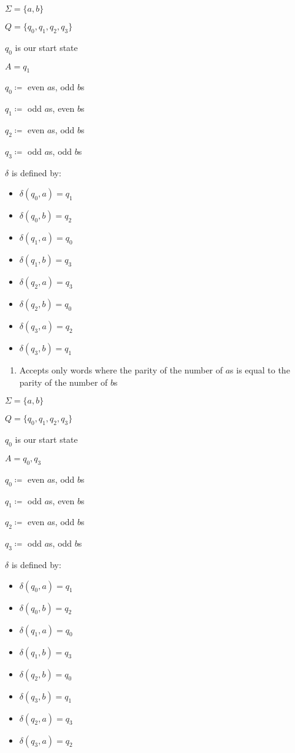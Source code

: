 \documentclass{article}
\begin{document}
\(\Sigma = \{a,b\}\)

\(Q = \{q_0, q_1, q_2, q_3\}\)

\(q_0\) is our start state

\(A = q_1\)

\(q_0 \coloneqq\) even \(a\)s, odd \(b\)s

\(q_1 \coloneqq\) odd \(a\)s, even \(b\)s

\(q_2 \coloneqq\) even \(a\)s, odd \(b\)s

\(q_3 \coloneqq\) odd \(a\)s, odd \(b\)s

\(\delta\) is defined by:
\begin{itemize}
    \item \(\delta(q_0, a) = q_1\)
    \item \(\delta(q_0, b) = q_2\)
    \item \(\delta(q_1, a) = q_0\)
    \item \(\delta(q_1, b) = q_3\)
    \item \(\delta(q_2, a) = q_3\)
    \item \(\delta(q_2, b) = q_0\)
    \item \(\delta(q_3, a) = q_2\)
    \item \(\delta(q_3, b) = q_1\)
\end{itemize}


\begin{enumerate}
\def\labelenumi{\arabic{enumi}.}
\setcounter{enumi}{2}
\item
  Accepts only words where the parity of the number of \(a\)s is equal
  to the parity of the number of \(b\)s
\end{enumerate}

\(\Sigma = \{a,b\}\)

\(Q = \{q_0, q_1, q_2, q_3\}\)

\(q_0\) is our start state

\(A = q_0, q_3\)

\(q_0 \coloneqq\) even \(a\)s, odd \(b\)s

\(q_1 \coloneqq\) odd \(a\)s, even \(b\)s

\(q_2 \coloneqq\) even \(a\)s, odd \(b\)s

\(q_3 \coloneqq\) odd \(a\)s, odd \(b\)s

\(\delta\) is defined by:
\begin{itemize}
    \item \(\delta(q_0, a) = q_1\)
    \item \(\delta(q_0, b) = q_2\)
    \item \(\delta(q_1, a) = q_0\)
    \item \(\delta(q_1, b) = q_3\)
    \item \(\delta(q_2, b) = q_0\)
    \item \(\delta(q_3, b) = q_1\)
    \item \(\delta(q_2, a) = q_3\)
    \item \(\delta(q_3, a) = q_2\)
\end{itemize}
\end{document}
